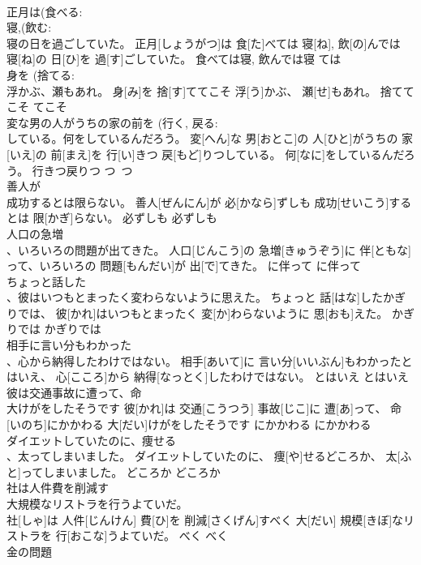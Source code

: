 \documentclass[8pt]{extreport}
\begin{document}
\begin{CJK}{UTF8}{min}
\\	正月は(食べる: 
\\	寝,(飲む: 
\\	寝の日を過ごしていた。	正月[しょうがつ]は 食[た]べては 寝[ね], 飲[の]んでは 寝[ね]の 日[ひ]を 過[す]ごしていた。	食べては寝, 飲んでは寝	ては	
\\	身を (捨てる: 
\\	浮かぶ、瀬もあれ。	身[み]を 捨[す]ててこそ 浮[う]かぶ、 瀬[せ]もあれ。	捨ててこそ	てこそ	
\\	変な男の人がうちの家の前を (行く, 戻る: 
\\	している。何をしているんだろう。	変[へん]な 男[おとこ]の 人[ひと]がうちの 家[いえ]の 前[まえ]を 行[い]きつ 戻[もど]りつしている。 何[なに]をしているんだろう。	行きつ戻りつ	つ~つ	
\\	善人が 
\\	成功するとは限らない。	善人[ぜんにん]が 必[かなら]ずしも 成功[せいこう]するとは 限[かぎ]らない。	必ずしも	必ずしも	
\\	人口の急増 
\\	、いろいろの問題が出てきた。	人口[じんこう]の 急増[きゅうぞう]に 伴[ともな]って、いろいろの 問題[もんだい]が 出[で]てきた。	に伴って	に伴って	
\\	ちょっと話した 
\\	、彼はいつもとまったく変わらないように思えた。	ちょっと 話[はな]したかぎりでは、 彼[かれ]はいつもとまったく 変[か]わらないように 思[おも]えた。	かぎりでは	かぎりでは	
\\	相手に言い分もわかった 
\\	、心から納得したわけではない。	相手[あいて]に 言い分[いいぶん]もわかったとはいえ、 心[こころ]から 納得[なっとく]したわけではない。	とはいえ	とはいえ	
\\	彼は交通事故に遭って、命 
\\	大けがをしたそうです	彼[かれ]は 交通[こうつう] 事故[じこ]に 遭[あ]って、 命[いのち]にかかわる 大[だい]けがをしたそうです	にかかわる	にかかわる	
\\	ダイエットしていたのに、痩せる 
\\	、太ってしまいました。	ダイエットしていたのに、 痩[や]せるどころか、 太[ふと]ってしまいました。	どころか	どころか	
\\	社は人件費を削減す 
\\	大規模なリストラを行うよていだ。	
\\	社[しゃ]は 人件[じんけん] 費[ひ]を 削減[さくげん]すべく 大[だい] 規模[きぼ]なリストラを 行[おこな]うよていだ。	べく	べく	
\\	金の問題 

\end{CJK}
\end{document}
